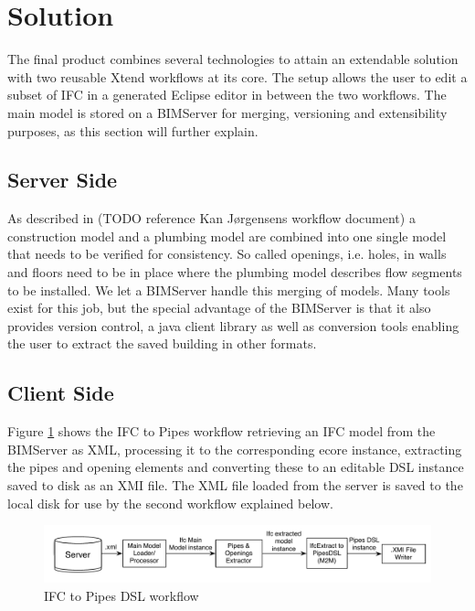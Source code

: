 \section{Solution}
The final product combines several technologies to attain an extendable solution with two reusable Xtend workflows at its core. The setup allows the user to edit a subset of IFC in a generated Eclipse editor in between the two workflows. The main model is stored on a BIMServer for merging, versioning and extensibility purposes, as this section will further explain.

\subsection{Server Side}
As described in (TODO reference Kan Jørgensens workflow document) a construction model and a plumbing model are combined into one single model that needs to be verified for consistency. So called openings, i.e. holes, in walls and floors need to be in place where the plumbing model describes flow segments to be installed. We let a BIMServer handle this merging of models. Many tools exist for this job, but the special advantage of the BIMServer is that it also provides version control, a java client library as well as conversion tools enabling the user to extract the saved building in other formats.

\subsection{Client Side}
Figure \ref{fig:IFC2PipesWorkflow} shows the IFC to Pipes workflow retrieving an IFC model from the BIMServer as XML, processing it to the corresponding ecore instance, extracting the pipes and opening elements and converting these to an editable DSL instance saved to disk as an XMI file. The XML file loaded from the server is saved to the local disk for use by the second workflow explained below.

\begin{figure}[htbp]
    \centering
        \includegraphics[width=120mm]{images/IFC2Pipes.pdf}
    \caption{IFC to Pipes DSL workflow}
    \label{fig:IFC2PipesWorkflow}
\end{figure}

